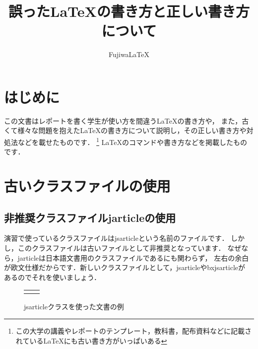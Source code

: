 \documentclass[dvipdfmx,uplatex]{jsarticle}
\title{誤った\LaTeX の書き方と正しい書き方について}
\author{Fujiwa\LaTeX}
\begin{document}
\maketitle
\tableofcontents
\section{はじめに}
この文書はレポートを書く学生が使い方を間違う\LaTeX の書き方や，
また，古くて様々な問題を抱えた\LaTeX の書き方について説明し，その正しい書き方や対処法などを載せたものです．%
\footnote{この大学の講義やレポートのテンプレート，教科書，配布資料などに記載されている\LaTeX にも古い書き方がいっぱいある}%
\LaTeX のコマンドや書き方などを掲載したものです．
\section{古いクラスファイルの使用}
\subsection{非推奨クラスファイルjarticleの使用}
演習で使っているクラスファイルはjsarticleという名前のファイルです．
しかし，このクラスファイルは古いファイルとして非推奨となっています．
なぜなら，jarticleは日本語文書用のクラスファイルであるにも関わらず，
左右の余白が欧文仕様だからです．新しいクラスファイルとして，jsarticleやbxjsarticleが
あるのでそれを使いましょう．
\begin{tcolorbox}[title=古いクラスファイルと新しいクラスファイル]
  \begin{tcolorbox}[title=jarticle, colframe=wrongcolor]
  \end{tcolorbox}
  \begin{tcolorbox}[title=jsarticle, colframe=correctcolor]
  \end{tcolorbox}
\end{tcolorbox}
\begin{figure}[H]
  \begin{tabular}{cc}
    \begin{minipage}{0.45\columnwidth}
      \centering
      \caption{jarticleクラスを使った文書の例}
    \end{minipage}
    \begin{minipage}{0.45\columnwidth}
      \centering
      \caption{jsarticleクラスを使った文書の例}
    \end{minipage}
  \end{tabular}
\end{figure}
\end{document}
